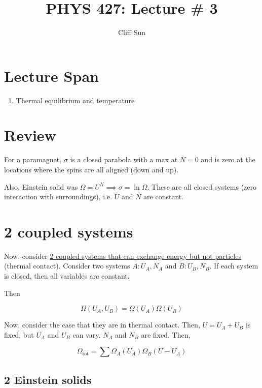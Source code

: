 \documentclass{article}
\title{PHYS 427: Lecture \# 3}
\author{Cliff Sun}
\newtheorem{one minute paper}[theorem]{One Minute Paper}
\begin{document}
\maketitle

\section*{Lecture Span}
\begin{enumerate}
    \item Thermal equilibrium and temperature
\end{enumerate}

\section*{Review}

For a paramagnet, $\sigma$ is a closed parabola with a max at $N=0$ and is zero at the locations where the spins are all aligned (down and up). 

Also, Einstein solid was $\Omega = U^N\implies \sigma = \ln \Omega$. These are all closed systems (zero interaction with surroundings), i.e. $U$ and $N$ are constant. 

\section*{2 coupled systems}

Now, consider \underline{2 coupled systems that can exchange energy but not particles} (thermal contact). Consider two systems $A: U_A, N_A$ and $B: U_B, N_B$. If each system is closed, then all variables are constant. 

Then 

\begin{equation}
    \Omega(U_A,U_B) = \Omega(U_A)\Omega(U_B)
\end{equation}

Now, consider the case that they are in thermal contact. Then, $U = U_A + U_B$ is fixed, but $U_A$ and $U_B$ can vary. $N_A$ and $N_B$ are fixed. Then, 

\begin{equation}
    \Omega_{\text{tot}} = \sum \Omega_A(U_A)\Omega_B(U - U_A)
\end{equation}

\subsection*{2 Einstein solids}
\end{document}
